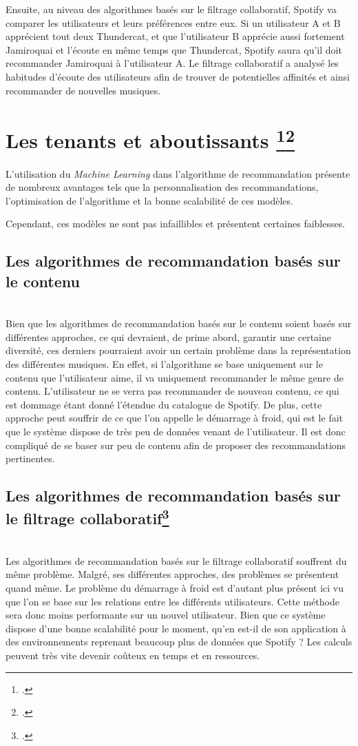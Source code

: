 \documentclass[12pt,a4paper]{article}
\begin{document}
Ensuite, au niveau des algorithmes basés sur le filtrage collaboratif, Spotify va comparer les utilisateurs et leurs préférences entre eux. Si un utilisateur A et B apprécient tout deux Thundercat, et que l'utilisateur B apprécie aussi fortement Jamiroquai et l'écoute en même temps que Thundercat, Spotify saura qu'il doit recommander Jamiroquai à l'utilisateur A. Le filtrage collaboratif a analysé les habitudes d'écoute des utilisateurs afin de trouver de potentielles affinités et ainsi recommander de nouvelles musiques.

\section{Les tenants et aboutissants \footcite{Adomavicius2005}\footcite{ibm_recommendation_engine}}
L'utilisation du \textit{Machine Learning} dans l'algorithme de recommandation présente de nombreux avantages tels que la personnalisation des recommandations, l'optimisation de l'algorithme et la bonne scalabilité de ces modèles.

Cependant, ces modèles ne sont pas infaillibles et présentent certaines faiblesses. 

\subsection{Les algorithmes de recommandation basés sur le contenu}
~\\
Bien que les algorithmes de recommandation basés sur le contenu soient basés sur différentes approches, ce qui devraient, de prime abord, garantir une certaine diversité, ces derniers pourraient avoir un certain problème dans la représentation des différentes musiques. En effet, si l'algorithme se base uniquement sur le contenu que l'utilisateur aime, il va uniquement recommander le même genre de contenu. L'utilisateur ne se verra pas recommander de nouveau contenu, ce qui est dommage étant donné l'étendue du catalogue de Spotify. De plus, cette approche peut souffrir de ce que l'on appelle le démarrage à froid, qui est le fait que le système dispose de très peu de données venant de l'utilisateur. Il est donc compliqué de se baser sur peu de contenu afin de proposer des recommandations pertinentes.

\subsection{Les algorithmes de recommandation basés sur le filtrage collaboratif\footcite{patissier2024recommandation}}
~\\
 Les algorithmes de recommandation basés sur le filtrage collaboratif souffrent du même problème. Malgré, ses différentes approches, des problèmes se présentent quand même. Le problème du démarrage à froid est d'autant plus présent ici vu que l'on se base sur les relations entre les différents utilisateurs. Cette méthode sera donc moins performante sur un nouvel utilisateur. Bien que ce système dispose d'une bonne scalabilité pour le moment, qu'en est-il de son application à des environnements reprenant beaucoup plus de données que Spotify ? Les calculs peuvent très vite devenir coûteux en temps et en ressources. 
 
\end{document}
